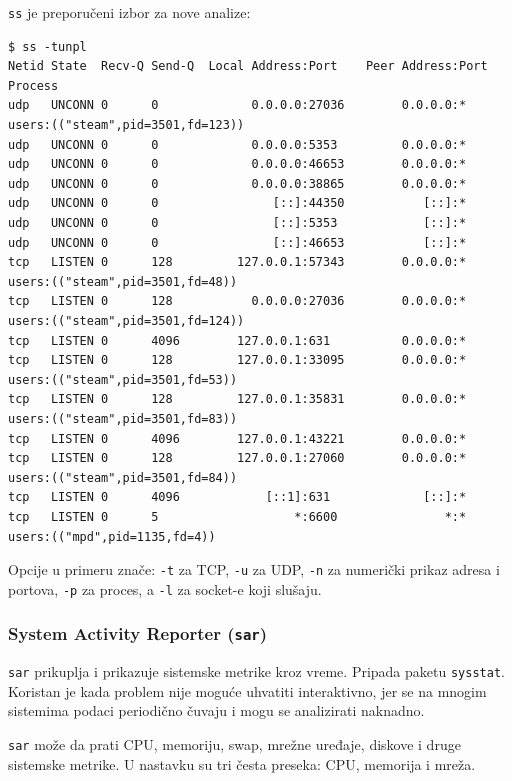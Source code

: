 \texttt{ss} je preporučeni izbor za nove analize:

\begin{verbatim}
$ ss -tunpl
Netid State  Recv-Q Send-Q  Local Address:Port    Peer Address:Port Process
udp   UNCONN 0      0             0.0.0.0:27036        0.0.0.0:*     users:(("steam",pid=3501,fd=123))
udp   UNCONN 0      0             0.0.0.0:5353         0.0.0.0:*
udp   UNCONN 0      0             0.0.0.0:46653        0.0.0.0:*
udp   UNCONN 0      0             0.0.0.0:38865        0.0.0.0:*
udp   UNCONN 0      0                [::]:44350           [::]:*
udp   UNCONN 0      0                [::]:5353            [::]:*
udp   UNCONN 0      0                [::]:46653           [::]:*
tcp   LISTEN 0      128         127.0.0.1:57343        0.0.0.0:*     users:(("steam",pid=3501,fd=48))
tcp   LISTEN 0      128           0.0.0.0:27036        0.0.0.0:*     users:(("steam",pid=3501,fd=124))
tcp   LISTEN 0      4096        127.0.0.1:631          0.0.0.0:*
tcp   LISTEN 0      128         127.0.0.1:33095        0.0.0.0:*     users:(("steam",pid=3501,fd=53))
tcp   LISTEN 0      128         127.0.0.1:35831        0.0.0.0:*     users:(("steam",pid=3501,fd=83))
tcp   LISTEN 0      4096        127.0.0.1:43221        0.0.0.0:*
tcp   LISTEN 0      128         127.0.0.1:27060        0.0.0.0:*     users:(("steam",pid=3501,fd=84))
tcp   LISTEN 0      4096            [::1]:631             [::]:*
tcp   LISTEN 0      5                   *:6600               *:*     users:(("mpd",pid=1135,fd=4))
\end{verbatim}

Opcije u primeru znače: \texttt{-t} za TCP, \texttt{-u} za UDP, \texttt{-n} za numerički prikaz adresa i portova, \texttt{-p} za proces, a \texttt{-l} za socket-e koji slušaju.

\subsubsection{\texorpdfstring{System Activity Reporter (\texttt{sar})}{System Activity Reporter (sar)}}\label{system-activity-reporter-sar}

\texttt{sar} prikuplja i prikazuje sistemske metrike kroz vreme. Pripada paketu \texttt{sysstat}. Koristan je kada problem nije moguće uhvatiti interaktivno, jer se na mnogim sistemima podaci periodično čuvaju i mogu se analizirati naknadno.

\texttt{sar} može da prati CPU, memoriju, swap, mrežne uređaje, diskove i druge sistemske metrike. U nastavku su tri česta preseka: CPU, memorija i mreža.

